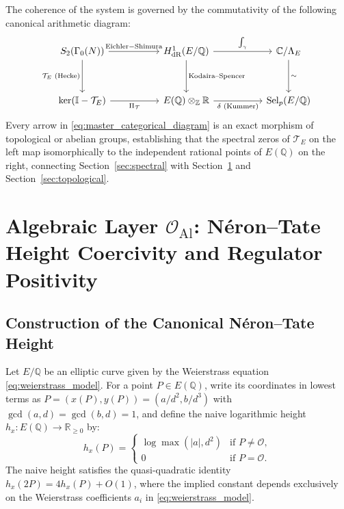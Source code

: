 \documentclass[11pt,reqno]{article}
\theoremstyle{plain}
\theoremstyle{definition}
\DeclareMathOperator{\Sel}{Sel}
\begin{document}
The coherence of the system is governed by the commutativity of the following canonical arithmetic diagram:
\begin{equation}
\label{eq:master_categorical_diagram}
\begin{tikzcd}[column sep=1.8cm, row sep=1.2cm]
S_2(\Gamma_0(N)) \arrow[r, "\mathrm{Eichler}-\mathrm{Shimura}"] \arrow[d, "\mathcal{T}_E \text{ (Hecke)}"'] & H^1_{\mathrm{dR}}(E/\mathbb{Q}) \arrow[r, "\int_{\gamma}"] \arrow[d, "\text{Kodaira--Spencer}"] & \mathbb{C}/\Lambda_E \arrow[d, "\sim"] \\
\ker(\mathbb{I} - \mathcal{T}_E) \arrow[r, "\Pi_{\mathcal{T}}"'] & E(\mathbb{Q}) \otimes_{\mathbb{Z}} \mathbb{R} \arrow[r, "\delta \text{ (Kummer)}"'] & \Sel_p(E/\mathbb{Q})
\end{tikzcd}
\end{equation}
Every arrow in \eqref{eq:master_categorical_diagram} is an exact morphism of topological or abelian groups, establishing that the spectral zeros of $\mathcal{T}_E$ on the left map isomorphically to the independent rational points of $E(\mathbb{Q})$ on the right, connecting Section~\ref{sec:spectral} with Section~\ref{sec:algebraic} and Section~\ref{sec:topological}.

\section{Algebraic Layer $\mathcal{O}_{\mathrm{Al}}$: Néron--Tate Height Coercivity and Regulator Positivity}
\label{sec:algebraic}

\subsection{Construction of the Canonical Néron--Tate Height}

Let $E/\mathbb{Q}$ be an elliptic curve given by the Weierstrass equation \eqref{eq:weierstrass_model}. For a point $P \in E(\mathbb{Q})$, write its coordinates in lowest terms as $P = (x(P), y(P)) = (a/d^2, b/d^3)$ with $\gcd(a, d) = \gcd(b, d) = 1$, and define the naive logarithmic height $h_x: E(\mathbb{Q}) \to \mathbb{R}_{\ge 0}$ by:
\begin{equation}
    h_x(P) = \begin{cases}
    \log \max(|a|, d^2) & \text{if } P \neq \mathcal{O}, \\
    0 & \text{if } P = \mathcal{O}.
    \end{cases}
\end{equation}
The naive height satisfies the quasi-quadratic identity $h_x(2P) = 4 h_x(P) + O(1)$, where the implied constant depends exclusively on the Weierstrass coefficients $a_i$ in \eqref{eq:weierstrass_model}. 
\end{document}
